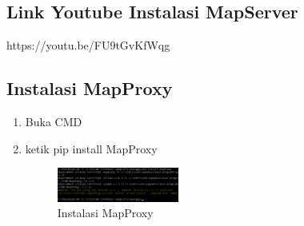 \subsection{Link Youtube Instalasi MapServer}
https://youtu.be/FU9tGvKfWqg

\subsection{Instalasi MapProxy}
\begin{enumerate}
  \item Buka CMD
  \item ketik pip install MapProxy
  \hfill\break
  \begin{figure}[H]
  \includegraphics[width=4cm]{figures/tugas4/1174079/mapproxyinstall.png}
  \centering
  \caption{Instalasi MapProxy}
  \end{figure}
\end{enumerate}

